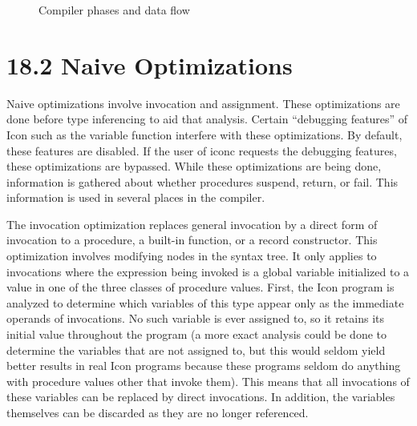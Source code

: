 \begin{figure}
\caption{Compiler phases and data flow}
\end{figure}

\section[18.2 Naive Optimizations]{18.2 Naive Optimizations}

Naive optimizations involve invocation and assignment. These
optimizations are done before type inferencing to aid that
analysis. Certain ``debugging features'' of Icon such as the
variable function interfere with these optimizations. By default,
these features are disabled. If the user of iconc requests the
debugging features, these optimizations are bypassed. While these
optimizations are being done, information is gathered about whether
procedures suspend, return, or fail. This information is used in
several places in the compiler.

The invocation optimization replaces general invocation by a direct
form of invocation to a procedure, a built-in function, or a record
constructor. This optimization involves modifying nodes in the syntax
tree. It only applies to invocations where the expression being
invoked is a global variable initialized to a value in one of the
three classes of procedure values. First, the Icon program is analyzed
to determine which variables of this type appear only as the immediate
operands of invocations. No such variable is ever assigned to, so it
retains its initial value throughout the program (a more exact
analysis could be done to determine the variables that are not
assigned to, but this would seldom yield better results in real Icon
programs because these programs seldom do anything with procedure
values other that invoke them). This means that all invocations of
these variables can be replaced by direct invocations. In addition,
the variables themselves can be discarded as they are no longer
referenced.

